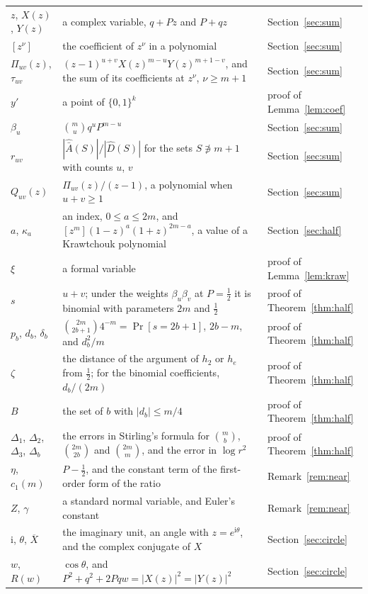 \documentclass[11pt]{amsart}
\theoremstyle{remark}
\newcommand{\ii}{\mathrm{i}}
\begin{document}
\begin{longtable}{@{}>{\raggedright\arraybackslash}p{}>{\raggedright\arraybackslash}p{}>{\raggedright\arraybackslash}p{}@{}}
$z$, $X(z)$, $Y(z)$ & a complex variable, $q+Pz$ and $P+qz$ & Section~\ref{sec:sum} \\
$[z^\nu]$ & the coefficient of $z^\nu$ in a polynomial & Section~\ref{sec:sum} \\
$\Pi_{uv}(z)$, $\tau_{uv}$ & $(z-1)^{u+v}X(z)^{m-u}Y(z)^{m+1-v}$, and the sum of its coefficients at $z^\nu$, $\nu\ge m+1$ & Section~\ref{sec:sum} \\
$y'$ & a point of $\{0,1\}^k$ & proof of Lemma~\ref{lem:coef} \\
$\beta_u$ & $\binom mu q^uP^{m-u}$ & Section~\ref{sec:sum} \\
$r_{uv}$ & $|\hat{\bar A}(S)|/|\hat D(S)|$ for the sets $S\not\ni m+1$ with counts $u$, $v$ & Section~\ref{sec:sum} \\
$Q_{uv}(z)$ & $\Pi_{uv}(z)/(z-1)$, a polynomial when $u+v\ge1$ & Section~\ref{sec:sum} \\
$a$, $\kappa_a$ & an index, $0\le a\le2m$, and $[z^m](1-z)^a(1+z)^{2m-a}$, a value of a Krawtchouk polynomial & Section~\ref{sec:half} \\
$\xi$ & a formal variable & proof of Lemma~\ref{lem:kraw} \\
$s$ & $u+v$; under the weights $\beta_u\beta_v$ at $P=\frac12$ it is binomial with parameters $2m$ and $\frac12$ & proof of Theorem~\ref{thm:half} \\
$p_b$, $d_b$, $\delta_b$ & $\binom{2m}{2b+1}4^{-m}=\Pr[s=2b+1]$, $2b-m$, and $d_b^2/m$ & proof of Theorem~\ref{thm:half} \\
$\zeta$ & the distance of the argument of $h_2$ or $h_e$ from $\frac12$; for the binomial coefficients, $d_b/(2m)$ & proof of Theorem~\ref{thm:half} \\
$B$ & the set of $b$ with $|d_b|\le m/4$ & proof of Theorem~\ref{thm:half} \\
$\Delta_1$, $\Delta_2$, $\Delta_3$, $\Delta_b$ & the errors in Stirling's formula for $\binom mb$, $\binom{2m}{2b}$ and $\binom{2m}m$, and the error in $\log r^2$ & proof of Theorem~\ref{thm:half} \\
$\eta$, $c_1(m)$ & $P-\frac12$, and the constant term of the first-order form of the ratio & Remark~\ref{rem:near} \\
$Z$, $\gamma$ & a standard normal variable, and Euler's constant & Remark~\ref{rem:near} \\
$\ii$, $\theta$, $\overline{X}$ & the imaginary unit, an angle with $z=e^{\ii\theta}$, and the complex conjugate of $X$ & Section~\ref{sec:circle} \\
$w$, $R(w)$ & $\cos\theta$, and $P^2+q^2+2Pqw=|X(z)|^2=|Y(z)|^2$ & Section~\ref{sec:circle} \\

\end{longtable}
\end{document}
